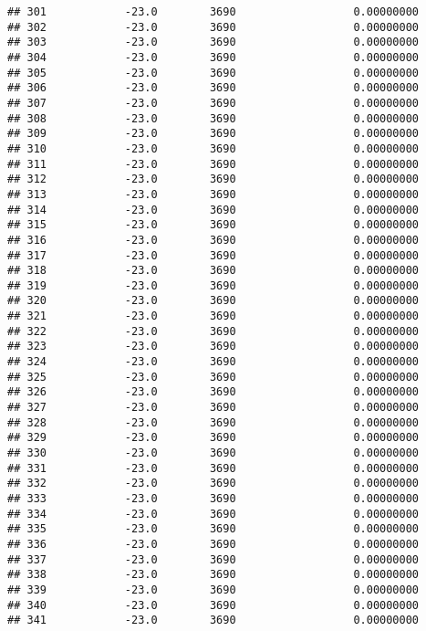 \documentclass[]{article}
\begin{document}
\begin{verbatim}
## 301            -23.0        3690                  0.00000000
## 302            -23.0        3690                  0.00000000
## 303            -23.0        3690                  0.00000000
## 304            -23.0        3690                  0.00000000
## 305            -23.0        3690                  0.00000000
## 306            -23.0        3690                  0.00000000
## 307            -23.0        3690                  0.00000000
## 308            -23.0        3690                  0.00000000
## 309            -23.0        3690                  0.00000000
## 310            -23.0        3690                  0.00000000
## 311            -23.0        3690                  0.00000000
## 312            -23.0        3690                  0.00000000
## 313            -23.0        3690                  0.00000000
## 314            -23.0        3690                  0.00000000
## 315            -23.0        3690                  0.00000000
## 316            -23.0        3690                  0.00000000
## 317            -23.0        3690                  0.00000000
## 318            -23.0        3690                  0.00000000
## 319            -23.0        3690                  0.00000000
## 320            -23.0        3690                  0.00000000
## 321            -23.0        3690                  0.00000000
## 322            -23.0        3690                  0.00000000
## 323            -23.0        3690                  0.00000000
## 324            -23.0        3690                  0.00000000
## 325            -23.0        3690                  0.00000000
## 326            -23.0        3690                  0.00000000
## 327            -23.0        3690                  0.00000000
## 328            -23.0        3690                  0.00000000
## 329            -23.0        3690                  0.00000000
## 330            -23.0        3690                  0.00000000
## 331            -23.0        3690                  0.00000000
## 332            -23.0        3690                  0.00000000
## 333            -23.0        3690                  0.00000000
## 334            -23.0        3690                  0.00000000
## 335            -23.0        3690                  0.00000000
## 336            -23.0        3690                  0.00000000
## 337            -23.0        3690                  0.00000000
## 338            -23.0        3690                  0.00000000
## 339            -23.0        3690                  0.00000000
## 340            -23.0        3690                  0.00000000
## 341            -23.0        3690                  0.00000000

\end{verbatim}
\end{document}
